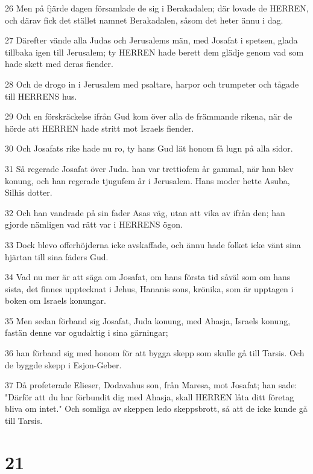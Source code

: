 \par 26 Men på fjärde dagen församlade de sig i Berakadalen; där lovade de HERREN, och därav fick det stället namnet Berakadalen, såsom det heter ännu i dag.
\par 27 Därefter vände alla Judas och Jerusalems män, med Josafat i spetsen, glada tillbaka igen till Jerusalem; ty HERREN hade berett dem glädje genom vad som hade skett med deras fiender.
\par 28 Och de drogo in i Jerusalem med psaltare, harpor och trumpeter och tågade till HERRENS hus.
\par 29 Och en förskräckelse ifrån Gud kom över alla de främmande rikena, när de hörde att HERREN hade stritt mot Israels fiender.
\par 30 Och Josafats rike hade nu ro, ty hans Gud lät honom få lugn på alla sidor.
\par 31 Så regerade Josafat över Juda. han var trettiofem år gammal, när han blev konung, och han regerade tjugufem år i Jerusalem. Hans moder hette Asuba, Silhis dotter.
\par 32 Och han vandrade på sin fader Asas väg, utan att vika av ifrån den; han gjorde nämligen vad rätt var i HERRENS ögon.
\par 33 Dock blevo offerhöjderna icke avskaffade, och ännu hade folket icke vänt sina hjärtan till sina fäders Gud.
\par 34 Vad nu mer är att säga om Josafat, om hans första tid såväl som om hans sista, det finnes upptecknat i Jehus, Hananis sons, krönika, som är upptagen i boken om Israels konungar.
\par 35 Men sedan förband sig Josafat, Juda konung, med Ahasja, Israels konung, fastän denne var ogudaktig i sina gärningar;
\par 36 han förband sig med honom för att bygga skepp som skulle gå till Tarsis. Och de byggde skepp i Esjon-Geber.
\par 37 Då profeterade Elieser, Dodavahus son, från Maresa, mot Josafat; han sade: "Därför att du har förbundit dig med Ahasja, skall HERREN låta ditt företag bliva om intet." Och somliga av skeppen ledo skeppsbrott, så att de icke kunde gå till Tarsis.

\chapter{21}

